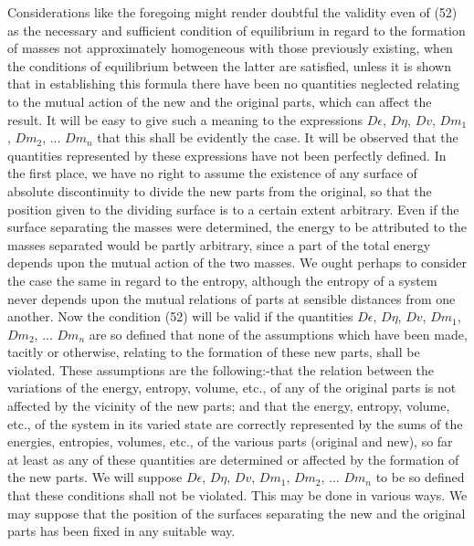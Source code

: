 \documentclass[12pt]{memoir}
\begin{document}
Considerations like the foregoing might render doubtful the validity even of (52) as the necessary and sufficient condition of equilibrium in regard to the formation of masses not approximately homogeneous with those previously existing, when the conditions of equilibrium between the latter are satisfied, unless it is shown that in establishing this formula there have been no quantities neglected relating to the mutual action of the new and the original parts, which can affect the result.  It will be easy to give such a meaning to the expressions $D\epsilon$, $D\eta$, $Dv$, $Dm_1$, $Dm_2$, ... $D m_n$ that this shall be evidently the case. It will be observed that the quantities represented by these expressions have not been perfectly defined. In the first place, we have no right to assume the existence of any surface of absolute discontinuity to divide the new parts from the original, so that the position given to the dividing surface is to a certain extent arbitrary.
Even if the surface separating the masses were determined, the energy to be attributed to the masses separated would be partly arbitrary, since a part of the total energy depends upon the mutual action of the two masses. We ought perhaps to consider the case the same in regard to the entropy, although the entropy of a system never depends upon the mutual relations of parts at sensible distances from one another. Now the condition (52) will be valid if the quantities $D\epsilon$, $D\eta$, $Dv$, $Dm_1$, $Dm_2$, ... $D m_n$ are so defined that none of the assumptions which have been made, tacitly or otherwise, relating to the formation of these new parts, shall be violated. These assumptions are the following:-that the relation between the variations of the energy, entropy, volume, etc., of any of the original parts is not affected by the vicinity of the new parts; and that the energy, entropy, volume, etc., of the system in its varied state are correctly represented by the sums of the energies, entropies, volumes, etc., of the various parts (original and new), so far at least as any of these quantities are determined or affected by the formation of the new parts. We will suppose $D\epsilon$, $D\eta$, $Dv$, $Dm_1$, $Dm_2$, ... $D m_n$ to be so defined that these conditions shall not be violated.  This may be done in various ways. We may suppose that the position of the surfaces separating the new and the original parts has been fixed in any suitable way.
\end{document}
